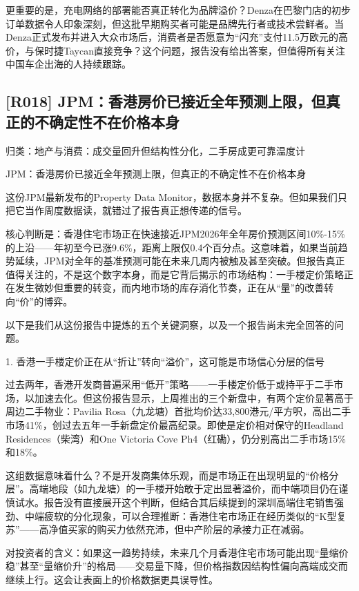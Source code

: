 \documentclass[11pt]{ctexart}
\begin{document}
更重要的是，充电网络的部署能否真正转化为品牌溢价？Denza在巴黎门店的初步订单数据令人印象深刻，但这批早期购买者可能是品牌先行者或技术尝鲜者。当Denza正式发布并进入大众市场后，消费者是否愿意为“闪充”支付11.5万欧元的高价，与保时捷Taycan直接竞争？这个问题，报告没有给出答案，但值得所有关注中国车企出海的人持续跟踪。

\subsection{[R018] JPM：香港房价已接近全年预测上限，但真正的不确定性不在价格本身}
{\small\color{refgray}归类：地产与消费：成交量回升但结构性分化，二手房成更可靠温度计}

JPM：香港房价已接近全年预测上限，但真正的不确定性不在价格本身

这份JPM最新发布的Property Data Monitor，数据本身并不复杂。但如果我们只把它当作周度数据读，就错过了报告真正想传递的信号。

核心判断是：香港住宅市场正在快速接近JPM2026年全年房价预测区间10\%-15\%的上沿——年初至今已涨9.6\%，距离上限仅0.4个百分点。这意味着，如果当前趋势延续，JPM对全年的基准预测可能在未来几周内被触及甚至突破。但报告真正值得关注的，不是这个数字本身，而是它背后揭示的市场结构：一手楼定价策略正在发生微妙但重要的转变，而内地市场的库存消化节奏，正在从“量”的改善转向“价”的博弈。

以下是我们从这份报告中提炼的五个关键洞察，以及一个报告尚未完全回答的问题。

1. 香港一手楼定价正在从“折让”转向“溢价”，这可能是市场信心分层的信号

过去两年，香港开发商普遍采用“低开”策略——一手楼定价低于或持平于二手市场，以加速去化。但这份报告显示，上周推出的三个新盘中，有两个定价显著高于周边二手物业：Pavilia Rosa（九龙塘）首批均价达33,800港元/平方呎，高出二手市场41\%，创过去五年一手新盘定价最高纪录。即使是定价相对保守的Headland Residences（柴湾）和One Victoria Cove Ph4（红磡），仍分别高出二手市场15\%和18\%。

这组数据意味着什么？不是开发商集体乐观，而是市场正在出现明显的“价格分层”。高端地段（如九龙塘）的一手楼开始敢于定出显著溢价，而中端项目仍在谨慎试水。报告没有直接展开这个判断，但结合其后续提到的深圳高端住宅销售强劲、中端疲软的分化现象，可以合理推断：香港住宅市场正在经历类似的“K型复苏”——高净值买家的购买力依然充沛，但中产阶层的承接力正在减弱。

对投资者的含义：如果这一趋势持续，未来几个月香港住宅市场可能出现“量缩价稳”甚至“量缩价升”的格局——交易量下降，但价格指数因结构性偏向高端成交而继续上行。这会让表面上的价格数据更具误导性。
\end{document}
